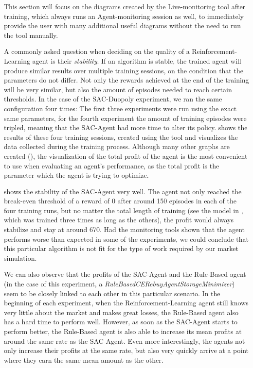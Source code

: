 This section will focus on the diagrams created by the Live-monitoring tool after training, which always runs an Agent-monitoring session as well, to immediately provide the user with many additional useful diagrams without the need to run the tool manually.

A commonly asked question when deciding on the quality of a Reinforcement-Learning agent is their \emph{stability}. If an algorithm is stable, the trained agent will produce similar results over multiple training sessions, on the condition that the parameters do not differ. Not only the rewards achieved at the end of the training will be very similar, but also the amount of episodes needed to reach certain thresholds. In the case of the SAC-Duopoly experiment, we ran the same configuration four times: The first three experiments were run using the exact same parameters, for the fourth experiment the amount of training episodes were tripled, meaning that the SAC-Agent had more time to alter its policy.  shows the results of these four training sessions, created using the  tool and visualizes the data collected during the training process. Although many other graphs are created (), the visualization of the total profit of the agent is the most convenient to use when evaluating an agent's performance, as the total profit is the parameter which the agent is trying to optimize.

 shows the stability of the SAC-Agent very well. The agent not only reached the break-even threshold of a reward of 0 after around 150 episodes in each of the four training runs, but no matter the total length of training (see the model in , which was trained three times as long as the others), the profit would always stabilize and stay at around 670. Had the monitoring tools shown that the agent performs worse than expected in some of the experiments, we could conclude that this particular algorithm is not fit for the type of work required by our market simulation.

We can also observe that the profits of the SAC-Agent and the Rule-Based agent (in the case of this experiment, a \emph{RuleBasedCERebuyAgentStorageMinimizer}) seem to be closely linked to each other in this particular scenario. In the beginning of each experiment, when the Reinforcement-Learning agent still knows very little about the market and makes great losses, the Rule-Based agent also has a hard time to perform well. However, as soon as the SAC-Agent starts to perform better, the Rule-Based agent is also able to increase its mean profits at around the same rate as the SAC-Agent. Even more interestingly, the agents not only increase their profits at the same rate, but also very quickly arrive at a point where they earn the same mean amount as the other.

